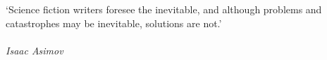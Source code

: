
\clearpage

\narrowlinespacing

\vspace*{4mm}

`Science fiction writers foresee the inevitable, and although problems and catastrophes may be inevitable, solutions are not.'\\
\\
\emph{Isaac Asimov}

\normallinespacing
